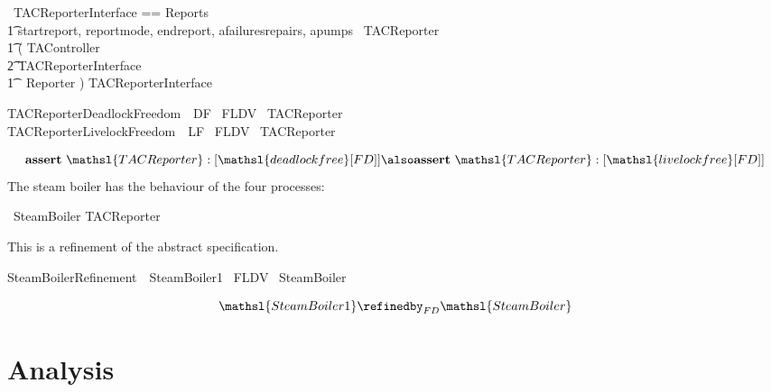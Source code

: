 \documentclass{report}
\begin{document}
\begin{circus}
   \circchannelset\ TACReporterInterface == Reports\ \cup \\
        \t1 \lchanset startreport, reportmode, endreport, afailuresrepairs, apumps \rchanset
   \also
   \circprocess\ TACReporter \circdef \\
    \t1 ( TAController \\
        \t2 \lpar TACReporterInterface \rpar \\
        \t1\ \ Reporter ) \circhide TACReporterInterface
\end{circus}
\begin{circus}
   TACReporterDeadlockFreedom\  \circassertref\ DF \circrefines\ FLDV~ TACReporter \\
   TACReporterLivelockFreedom\ \circassertref\ LF \circrefines\ FLDV~ TACReporter \\
\end{circus}
\[
  \mathbf{assert}\ \mathsl{TACReporter} :[ \mathsl{deadlock free } [FD] ]
  \also %
  \mathbf{assert}\ \mathsl{TACReporter} :[ \mathsl{livelock free } [FD] ]
\]
The steam boiler has the behaviour of the four processes:
\begin{circus}
  \circprocess\ SteamBoiler \circdef TACReporter
\end{circus}
This is a refinement of the abstract specification.
\begin{circus}
    SteamBoilerRefinement\ \circassertref\ SteamBoiler1 \circrefines\ FLDV~ SteamBoiler
\end{circus}
\[
  \mathsl{SteamBoiler1} \refinedby_{FD} \mathsl{SteamBoiler}
\]


\chapter{Analysis}
\end{document}
